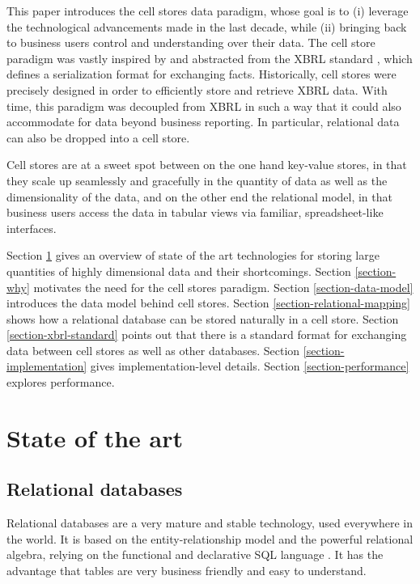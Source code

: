 \documentclass{acm_proc_article-sp}
\begin{document}
This paper introduces the cell stores data paradigm, whose goal is to (i) leverage the technological advancements made in the last decade, while (ii) bringing back to business users control and understanding over their data. The cell store paradigm was vastly inspired by and abstracted from the XBRL standard \cite{XBRL}, which defines a serialization format for exchanging facts. Historically, cell stores were precisely designed in order to efficiently store and retrieve XBRL data. With time, this paradigm was decoupled from XBRL in such a way that it could also accommodate for data beyond business reporting. In particular, relational data can also be dropped into a cell store.

Cell stores are at a sweet spot between on the one hand key-value stores, in that they scale up seamlessly and gracefully in the quantity of data as well as the dimensionality of the data, and on the other end the relational model, in that business users access the data in tabular views via familiar, spreadsheet-like interfaces.

Section \ref{section-state-of-the-art} gives an overview of state of the art technologies for storing large quantities of highly dimensional data and their shortcomings. Section \ref{section-why} motivates the need for the cell stores paradigm. Section \ref{section-data-model} introduces the data model behind cell stores. Section \ref{section-relational-mapping} shows how a relational database can be stored naturally in a cell store. Section \ref{section-xbrl-standard} points out that there is a standard format for exchanging data between cell stores as well as other databases. Section \ref{section-implementation} gives implementation-level details. Section \ref{section-performance} explores performance.

\section{State of the art}
\label{section-state-of-the-art}

\subsection{Relational databases}

Relational databases are a very mature and stable technology, used everywhere in the world. It is based on the entity-relationship model and the powerful relational algebra, relying on the functional and declarative SQL language \cite{Chamberlin1974}. It has the advantage that tables are very business friendly and easy to understand.
\end{document}
